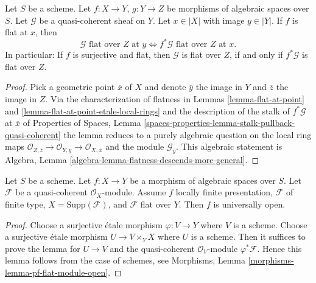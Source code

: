 \begin{lemma}
\label{lemma-flat-permanence}
Let $S$ be a scheme. Let $f : X \to Y$, $g : Y \to Z$ be morphisms of
algebraic spaces over $S$. Let $\mathcal{G}$ be a quasi-coherent sheaf on $Y$.
Let $x \in |X|$ with image $y \in |Y|$.
If $f$ is flat at $x$, then
$$
\mathcal{G}\text{ flat over }Z\text{ at }y
\Leftrightarrow
f^*\mathcal{G}\text{ flat over }Z\text{ at }x.
$$
In particular: If $f$ is surjective and flat, then
$\mathcal{G}$ is flat over $Z$, if and only if
$f^*\mathcal{G}$ is flat over $Z$.
\end{lemma}

\begin{proof}
Pick a geometric point $\overline{x}$ of $X$ and denote
$\overline{y}$ the image in $Y$ and $\overline{z}$ the image in $Z$.
Via the characterization of flatness in
Lemmas \ref{lemma-flat-at-point} and
\ref{lemma-flat-at-point-etale-local-rings}
and the description of the stalk of $f^*\mathcal{G}$ at $\overline{x}$ of
Properties of Spaces,
Lemma \ref{spaces-properties-lemma-stalk-pullback-quasi-coherent}
the lemma reduces to a purely algebraic question on the local
ring maps
$\mathcal{O}_{Z, \overline{z}} \to \mathcal{O}_{Y, \overline{y}}
\to \mathcal{O}_{X, \overline{x}}$
and the module $\mathcal{G}_{\overline{y}}$.
This algebraic statement is
Algebra, Lemma \ref{algebra-lemma-flatness-descends-more-general}.
\end{proof}

\begin{lemma}
\label{lemma-pf-flat-module-open}
Let $S$ be a scheme.
Let $f : X \to Y$ be a morphism of algebraic spaces over $S$.
Let $\mathcal{F}$ be a quasi-coherent $\mathcal{O}_X$-module.
Assume $f$ locally finite presentation, $\mathcal{F}$ of
finite type, $X = \text{Supp}(\mathcal{F})$, and
$\mathcal{F}$ flat over $Y$. Then $f$ is universally open.
\end{lemma}

\begin{proof}
Choose a surjective \'etale morphism $\varphi : V \to Y$ where $V$ is a scheme.
Choose a surjective \'etale morphism $U \to V \times_Y X$ where $U$ is a scheme.
Then it suffices to prove the lemma for $U \to V$ and the quasi-coherent
$\mathcal{O}_V$-module $\varphi^*\mathcal{F}$.
Hence this lemma follows from the case of schemes, see
Morphisms, Lemma \ref{morphisms-lemma-pf-flat-module-open}.
\end{proof}






